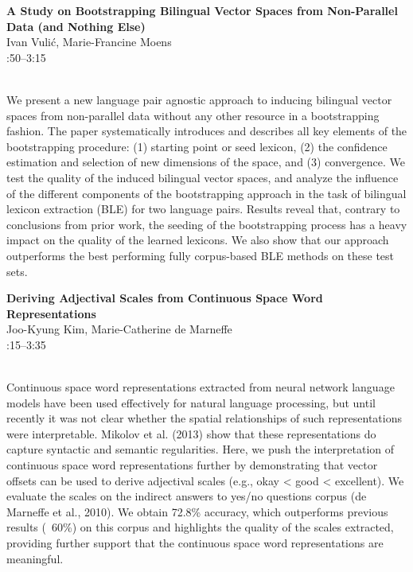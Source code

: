 \documentclass[twoside,makeidx]{book}
\renewcommand{\normalsize}{\fontsize{8}{9}\selectfont}
\renewcommand{\small}{\fontsize{7}{8}\selectfont}
\begin{document}
\par\vspace{2em}\noindent%
\begin{minipage}{\linewidth}%
\begin{center}
\textbf{\normalsize A Study on Bootstrapping Bilingual Vector Spaces from Non-Parallel Data (and Nothing Else)}\\
\normalsize  Ivan Vuli\'{c},  Marie-Francine Moens\\
{\small 2:50--3:15}\\
\end{center}
\end{minipage}\\[0.5em]
\nopagebreak%
\noindent%
{\small We present a new language pair agnostic approach to inducing bilingual vector spaces from non-parallel data without any other resource in a bootstrapping fashion. The paper systematically introduces and describes all key elements of the bootstrapping procedure: (1) starting point or seed lexicon, (2) the confidence estimation and selection of new dimensions of the space, and (3) convergence. We test the quality of the induced bilingual vector spaces, and analyze the influence of the different components of the bootstrapping approach in the task of bilingual lexicon extraction (BLE) for two language pairs. Results reveal that, contrary to conclusions from prior work, the seeding of the bootstrapping process has a heavy impact on the quality of the learned lexicons. We also show that our approach outperforms the best performing fully corpus-based BLE methods on these test sets.}
\par\vspace{2em}\noindent%
\begin{minipage}{\linewidth}%
\begin{center}
\textbf{\normalsize Deriving Adjectival Scales from Continuous Space Word Representations}\\
\normalsize  Joo-Kyung Kim,  Marie-Catherine de Marneffe\\
{\small 3:15--3:35}\\
\end{center}
\end{minipage}\\[0.5em]
\nopagebreak%
\noindent%
{\small Continuous space word representations extracted from neural network language models have been used effectively for natural language processing, but until recently it was not clear whether the spatial relationships of such representations were interpretable. Mikolov et al. (2013) show that these representations do capture syntactic and semantic regularities. Here, we push the interpretation of continuous space word representations further by demonstrating that vector offsets can be used to derive adjectival scales (e.g., okay < good < excellent). We evaluate the scales on the indirect answers to yes/no questions corpus (de Marneffe et al., 2010). We obtain 72.8\% accuracy, which outperforms previous results (~60\%) on this corpus and highlights the quality of the scales extracted, providing further support that the continuous space word representations are meaningful.}
\clearpage
\end{document}
